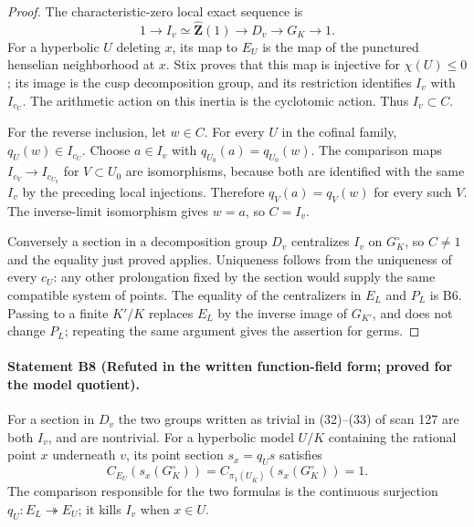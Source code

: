 \begin{proof}
The characteristic-zero local exact sequence is
\[
 1\longrightarrow I_v\simeq\widehat{\mathbf Z}(1)
 \longrightarrow D_v\longrightarrow G_K\longrightarrow1.
\]
For a hyperbolic $U$ deleting $x$, its map to $E_U$ is the map of the
punctured henselian neighborhood at $x$. Stix
\cite[Lemma 10]{B_Stix2008} proves that this map is injective for
$\chi(U)\le0$; its image is the cusp decomposition group, and its
restriction identifies $I_v$ with $I_{c_U}$. The arithmetic action on this
inertia is the cyclotomic action. Thus $I_v\subset C$.

For the reverse inclusion, let $w\in C$. For every $U$ in the cofinal
family, $q_U(w)\in I_{c_U}$. Choose $a\in I_v$ with
$q_{U_0}(a)=q_{U_0}(w)$. The comparison maps
$I_{c_V}\to I_{c_{U_0}}$ for $V\subset U_0$ are isomorphisms, because
both are identified with the same $I_v$ by the preceding local
injections. Therefore $q_V(a)=q_V(w)$ for every such $V$. The inverse-limit
isomorphism gives $w=a$, so $C=I_v$.

Conversely a section in a decomposition group $D_v$ centralizes $I_v$
on $G_K^\circ$, so $C\ne1$ and the equality just proved applies.
Uniqueness follows from the uniqueness of every $c_U$: any other
prolongation fixed by the section would supply the same compatible
system of points. The equality of the centralizers in $E_L$ and $P_L$
is B6. Passing to a finite $K'/K$ replaces $E_L$ by the inverse image of
$G_{K'}$, and does not change $P_L$; repeating the same argument gives
the assertion for germs.
\end{proof}

\paragraph{Statement B8 (Refuted in the written function-field form;
proved for the model quotient).}\label{res:B8}
For a section in $D_v$ the two groups written as trivial in (32)--(33)
of scan 127 are both $I_v$, and are nontrivial. For a hyperbolic model
$U/K$ containing the rational point $x$ underneath $v$, its point section
$s_x=q_Us$ satisfies
\[
 C_{E_U}(s_x(G_K^\circ))
 =C_{\pi_1(U_{\overline K})}(s_x(G_K^\circ))=1.
\]
The comparison responsible for the two formulas is the continuous
surjection $q_U:E_L\twoheadrightarrow E_U$; it kills $I_v$ when $x\in U$.

